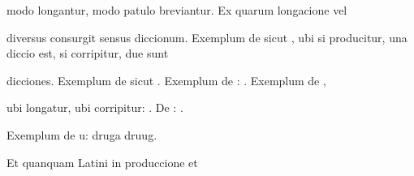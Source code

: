 \renewcommand{\theFancyVerbLine}{06-\arabic{FancyVerbLine}\phantom{a}}
%
\begin{VerbatimLatin}[firstnumber=10]
modo longantur, modo patulo breviantur. Ex quarum longacione vel 

 diversus consurgit sensus diccionum. Exemplum de  sicut 
, ubi si  producitur, una diccio est, si corripitur, due sunt

dicciones. Exemplum de  sicut  . Exemplum de :  . Exemplum de , 

ubi longatur, ubi corripitur:  . De :  .
\end{VerbatimLatin}
\renewcommand{\theFancyVerbLine}{\textcolor{green}{06-15\alph{FancyVerbLine}}}
\begin{VerbatimLatin}[firstnumber=1]
Exemplum de u: druga druug.

\indentK Et quanquam Latini in produccione et 
\end{VerbatimLatin}


